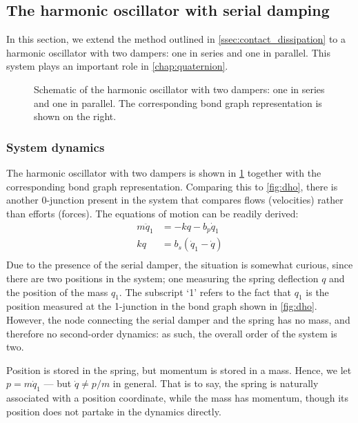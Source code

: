 \subsection{The harmonic oscillator with serial damping}
\label{ssec:serial_damping}
In this section, we extend the method outlined in \cref{ssec:contact_dissipation} to a harmonic oscillator with two dampers: one in series and one in parallel. This system plays an important role in \cref{chap:quaternion}.
\begin{figure}[ht!]
    \centering
    
    \caption{Schematic of the harmonic oscillator with two dampers: one in series and one in parallel. The corresponding bond graph representation is shown on the right.}
    \label{fig:double_damped_osc}
\end{figure}

\subsubsection{System dynamics}
The harmonic oscillator with two dampers is shown in \cref{fig:double_damped_osc} together with the corresponding bond graph representation. Comparing this to \cref{fig:dho}, there is another 0-junction present in the system that compares flows (velocities) rather than efforts (forces). The equations of motion can be readily derived:
\begin{equation}
    \begin{split}
        m\ddot{q}_1 &= -kq - b_p \dot{q}_1 \\
        kq &= b_s(\dot{q}_1 - \dot{q}) \\
    \end{split}
    \label{eq:serial_eom_raw}
\end{equation}
Due to the presence of the serial damper, the situation is somewhat curious, since there are two positions in the system; one measuring the spring deflection \(q\) and the position of the mass \(q_1\). The subscript `1' refers to the fact that \(q_1\) is the position measured at the 1-junction in the bond graph shown in \cref{fig:dho}. However, the node connecting the serial damper and the spring has no mass, and therefore no second-order dynamics: as such, the overall order of the system is two. 

Position is stored in the spring, but momentum is stored in a mass.
Hence, we let \(p = m\dot{q}_1\) --- but \(\dot{q} \neq p/m\) in general. That is to say, the spring is naturally associated with a position coordinate, while the mass has momentum, though its position does not partake in the dynamics directly.

